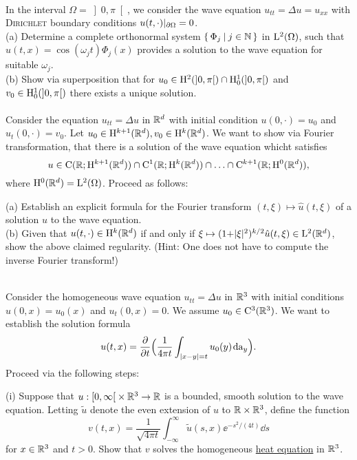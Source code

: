 \documentclass[12pt,a4paper]{article}
\begin{document}
\\ 
In the interval $\Omega= \left]0,\pi \right[$, 
we consider the wave equation $u_{tt}=\Delta
 u=u_{xx}$ with {\scshape Dirichlet} boundary conditions
 $u(t,\cdot)|_{\partial\Omega}=0$.\\

(a) Determine a complete orthonormal system $ \{\, \Phi_j  \: | \: j\in {\mathbb N} \,\}$
in ${\mathrm L}^2(\Omega)$, such that
$u(t,x)=\cos(\omega_j t)\Phi_j(x)$ provides a solution to the wave
equation for suitable $\omega_j$.\\

(b) Show via superposition that for $u_0 \in {\mathrm H}^2(\left] 0, \pi\right[) \cap {\mathrm H}_0^1(\left] 0,\pi \right[)$
and $v_0 \in {\mathrm H}_0^1(\left] 0,\pi\right[)$ there exists a unique solution.\\

\\
Consider the equation $u_{tt} = \Delta u$ in ${\mathbb R}^d$ with initial condition $u(0,\cdot) = u_0$ and $u_t(0,\cdot) = v_0$.
Let $u_0 \in {\mathrm H}^{k+1}({\mathbb R}^d), v_0\in {\mathrm H}^k({\mathbb R}^d)$. We want to show via Fourier transformation, that there is a solution 
of the wave equation
whicht satisfies \[u\in {\mathrm C}({\mathbb R}; {\mathrm H}^{k+1}({\mathbb R}^d)) \cap {\mathrm C}^1({\mathbb R};{\mathrm H}^k({\mathbb R}^d)) \cap \ldots \cap {\mathrm C}^{k+1}({\mathbb R};{\mathrm H}^0({\mathbb R}^d)),
\]
where ${\mathrm H}^0({\mathbb R}^d)={\mathrm L}^2(\Omega)$. Proceed as follows:

(a) Establish an explicit formula for the Fourier transform 
$(t,\xi)\mapsto\hat{u}(t,\xi)$ of a solution $u$ to the wave equation.\\

(b) Given that $u(t,\cdot) \in {\mathrm H}^k({\mathbb R}^d)$ if and only if $\xi\mapsto
(1{+}\vert \xi\vert^2)^{k/2}\hat{u}(t,\xi) \in {\mathrm L}^2({\mathbb R}^d)$, 
show the above claimed regularity. (Hint: One does not have to compute the inverse Fourier transform!)

\\
Consider the homogeneous wave equation 
$u_{tt}=\Delta u$ in ${\mathbb R}^3$ with initial conditions
$u(0,x)= u_0(x)$ and $u_t(0,x) =  0$.
We assume $u_0\in{\mathrm C}^3({\mathbb R}^3)$.
 We want to establish the solution formula
 \[
u(t,x) = \frac{\partial}{\partial t}\Big(\frac{1}{4\pi t}\int_{|x{-}y|=t}u_0(y)\;\!\mathrm{d} {\mathrm a}_y\Big).
 \]
Proceed via the following steps:

(i) Suppose that $u:\left[0,\infty\right[\times {\mathbb R}^3\to {\mathbb R}$ is a bounded, smooth solution
to the wave equation. Letting $\tilde u$ denote the even extension
of $u$ to ${\mathbb R}\times {\mathbb R}^3$, define the function
\[
v(t,x) = \frac{1}{\sqrt{4\pi t}}\int_{-\infty}^\infty
\tilde u(s,x)\ee^{-s^2/(4t)}\dd s
\] for $x\in {\mathbb R}^3$ and $t>0$. Show that $v$ solves the 
homogeneous \underline{heat equation} in ${\mathbb R}^3$.
\end{document}
